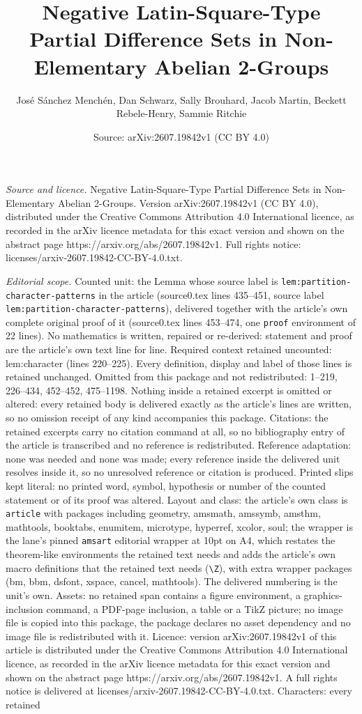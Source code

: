 \documentclass[10pt,a4paper]{amsart}
\title[Negative Latin-Square-Type Partial Difference Sets in Non-El]{Negative Latin-Square-Type Partial Difference Sets in Non-Elementary Abelian 2-Groups}
\author{Jos\'e S\'anchez Mench\'en, Dan Schwarz, Sally Brouhard, Jacob Martin, Beckett Rebele-Henry, Sammie Ritchie}
\date{Source: arXiv:2607.19842v1 (CC BY 4.0)}
\begin{document}
\maketitle

\noindent\emph{Source and licence.} Negative Latin-Square-Type Partial Difference Sets in Non-Elementary Abelian 2-Groups. Version arXiv:2607.19842v1 (CC BY 4.0), distributed under the Creative Commons Attribution 4.0 International licence, as recorded in the arXiv licence metadata for this exact version and shown on the abstract page https://arxiv.org/abs/2607.19842v1. Full rights notice: licenses/arxiv-2607.19842-CC-BY-4.0.txt.\par\smallskip

\noindent\textit{Editorial scope.} Counted unit: the Lemma whose source label is \texttt{lem:partition-character-patterns} in the article (source0.tex lines 435--451, source label \texttt{lem:partition-character-patterns}), delivered together with the article's own complete original proof of it (source0.tex lines 453--474, one \texttt{proof} environment of 22 lines). No mathematics is written, repaired or re-derived: statement and proof are the article's own text line for line. Required context retained uncounted: lem:character (lines 220--225). Every definition, display and label of those lines is retained unchanged. Omitted from this package and not redistributed: 1--219, 226--434, 452--452, 475--1198. Nothing inside a retained excerpt is omitted or altered: every retained body is delivered exactly as the article's lines are written, so no omission receipt of any kind accompanies this package. Citations: the retained excerpts carry no citation command at all, so no bibliography entry of the article is transcribed and no reference is redistributed. Reference adaptation: none was needed and none was made; every reference inside the delivered unit resolves inside it, so no unresolved reference or citation is produced. Printed slips kept literal: no printed word, symbol, hypothesis or number of the counted statement or of its proof was altered. Layout and class: the article's own class is \texttt{article} with packages including geometry, amsmath, amssymb, amsthm, mathtools, booktabs, enumitem, microtype, hyperref, xcolor, soul; the wrapper is the lane's pinned \texttt{amsart} editorial wrapper at 10pt on A4, which restates the theorem-like environments the retained text needs and adds the article's own macro definitions that the retained text needs (\texttt{\textbackslash Z}), with extra wrapper packages (bm, bbm, dsfont, xspace, cancel, mathtools). The delivered numbering is the unit's own. Assets: no retained span contains a figure environment, a graphics-inclusion command, a PDF-page inclusion, a table or a TikZ picture; no image file is copied into this package, the package declares no asset dependency and no image file is redistributed with it. Licence: version arXiv:2607.19842v1 of this article is distributed under the Creative Commons Attribution 4.0 International licence, as recorded in the arXiv licence metadata for this exact version and shown on the abstract page https://arxiv.org/abs/2607.19842v1. A full rights notice is delivered at licenses/arxiv-2607.19842-CC-BY-4.0.txt. Characters: every retained 
\end{document}
